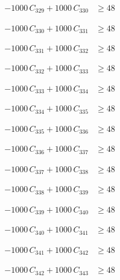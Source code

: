 \documentclass[a4paper,11pt]{article}
\begin{document}
\begin{align}
-1000\,C_{329} + 1000\,C_{330} &\geq 48 \nonumber
\end{align}

\begin{align}
-1000\,C_{330} + 1000\,C_{331} &\geq 48 \nonumber
\end{align}

\begin{align}
-1000\,C_{331} + 1000\,C_{332} &\geq 48 \nonumber
\end{align}

\begin{align}
-1000\,C_{332} + 1000\,C_{333} &\geq 48 \nonumber
\end{align}

\begin{align}
-1000\,C_{333} + 1000\,C_{334} &\geq 48 \nonumber
\end{align}

\begin{align}
-1000\,C_{334} + 1000\,C_{335} &\geq 48 \nonumber
\end{align}

\begin{align}
-1000\,C_{335} + 1000\,C_{336} &\geq 48 \nonumber
\end{align}

\begin{align}
-1000\,C_{336} + 1000\,C_{337} &\geq 48 \nonumber
\end{align}

\begin{align}
-1000\,C_{337} + 1000\,C_{338} &\geq 48 \nonumber
\end{align}

\begin{align}
-1000\,C_{338} + 1000\,C_{339} &\geq 48 \nonumber
\end{align}

\begin{align}
-1000\,C_{339} + 1000\,C_{340} &\geq 48 \nonumber
\end{align}

\begin{align}
-1000\,C_{340} + 1000\,C_{341} &\geq 48 \nonumber
\end{align}

\begin{align}
-1000\,C_{341} + 1000\,C_{342} &\geq 48 \nonumber
\end{align}

\begin{align}
-1000\,C_{342} + 1000\,C_{343} &\geq 48 \nonumber
\end{align}
\end{document}
